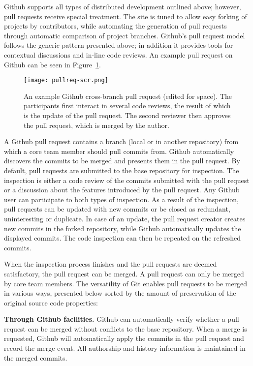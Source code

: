 \documentclass{sig-alternate}
\begin{document}
Github supports all types of distributed development outlined above; however,
pull requests receive special treatment. The site is tuned to allow easy forking
of projects by contributors, while automating the generation of pull requests
through automatic comparison of project branches.
Github's pull request model follows the generic pattern presented above; in
addition it provides tools for contextual discussions and in-line code reviews.
An example pull request on Github can be seen in Figure~\ref{fig:pullreq-scr}.

\begin{figure}[t]
  \centering
   \texttt{[image: pullreq-scr.png]}
   \label{fig:pullreq-scr}

   \caption{An example Github cross-branch pull request (edited for space). The
   participants first interact in several code reviews, the result of which is
   the update of the pull request. The second reviewer then approves the pull
   request, which is merged by the author.}

\end{figure}

A Github pull request contains a branch (local or in another repository) from
which a core team member should pull commits from. Github automatically
discovers the commits to be merged and presents them in the pull request. By
default, pull requests are submitted to the base repository for inspection. The
inspection is either a code review of the commits submitted with the pull
request or a discussion about the features introduced by the pull request. Any
Github user can participate to both types of inspection. As a result of the
inspection, pull requests can be updated with new commits or be closed as
redundant, uninteresting or duplicate. In case of an update, the pull request
creator creates new commits in the forked repository, while Github automatically
updates the displayed commits. The code inspection can then be repeated on the
refreshed commits.

When the inspection process finishes and the pull requests are deemed
satisfactory, the pull request can be merged. A pull request can only be merged
by core team members. The versatility of Git enables pull requests to be
merged in various ways, presented below sorted by the amount of preservation of
the original source code properties:

\textbf{Through Github facilities.}
    Github can automatically verify whether a
    pull request can be merged without conflicts to the base repository. When a
    merge is requested, Github will automatically apply the commits in the pull
    request and record the merge event. All authorship and history information
    is maintained in the merged commits.
\end{document}
